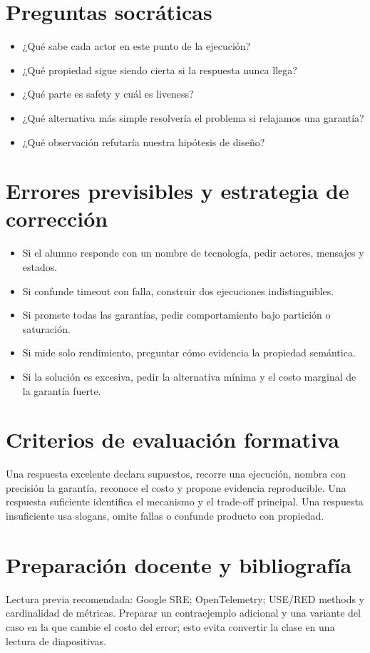 \documentclass[variant=docente,cover=institutional,mode=screen]{ua-engineering-v6-article}
\begin{document}
\section{Preguntas socráticas}
\begin{itemize}
\item ¿Qué sabe cada actor en este punto de la ejecución?
\item ¿Qué propiedad sigue siendo cierta si la respuesta nunca llega?
\item ¿Qué parte es safety y cuál es liveness?
\item ¿Qué alternativa más simple resolvería el problema si relajamos una garantía?
\item ¿Qué observación refutaría nuestra hipótesis de diseño?
\end{itemize}

\section{Errores previsibles y estrategia de corrección}
\begin{itemize}
\item Si el alumno responde con un nombre de tecnología, pedir actores, mensajes y estados.
\item Si confunde timeout con falla, construir dos ejecuciones indistinguibles.
\item Si promete todas las garantías, pedir comportamiento bajo partición o saturación.
\item Si mide solo rendimiento, preguntar cómo evidencia la propiedad semántica.
\item Si la solución es excesiva, pedir la alternativa mínima y el costo marginal de la garantía fuerte.
\end{itemize}

\section{Criterios de evaluación formativa}
Una respuesta excelente declara supuestos, recorre una ejecución, nombra con precisión la garantía, reconoce el costo y propone evidencia reproducible. Una respuesta suficiente identifica el mecanismo y el trade-off principal. Una respuesta insuficiente usa slogans, omite fallas o confunde producto con propiedad.

\section{Preparación docente y bibliografía}
Lectura previa recomendada: Google SRE; OpenTelemetry; USE/RED methods y cardinalidad de métricas. Preparar un contraejemplo adicional y una variante del caso en la que cambie el costo del error; esto evita convertir la clase en una lectura de diapositivas.
\end{document}
